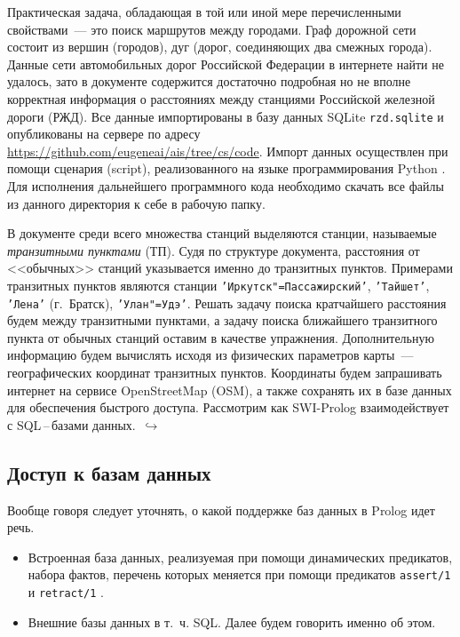 \documentclass[a4paper,14pt, openany, twoside, draft]{extbook} %
\newcommand{\nnn}[2][ncolor]{\noindent%
\textcolor{eclr}{!\ [}\textcolor{#1}{#2}\textcolor{eclr}{]}}
\newcommand{\goforth}[1]{$\,\hookrightarrow$\pageref{#1}}
\begin{document}

Практическая задача, обладающая в той или иной мере перечисленными свойствами~--- это поиск маршрутов между городами.  Граф дорожной сети состоит из вершин (городов), дуг (дорог, соединяющих два смежных города).  Данные сети автомобильных дорог Российской Федерации в интернете найти не удалось, зато в документе \cite{rzhddb} содержится достаточно подробная но не вполне корректная информация о расстояниях между станциями Российской железной дороги (РЖД).  Все данные импортированы в базу данных SQLite \cite{sqlite} \texttt{rzd.sqlite} и опубликованы на сервере по адресу \url{https://github.com/eugeneai/ais/tree/cs/code}.  Импорт данных осуществлен при помощи сценария (script), реализованного на языке программирования Python \cite{pythondoc,pythondl,pythonbook}.  Для исполнения дальнейшего программного кода необходимо скачать все файлы из данного директория к себе в рабочую папку.

В документе \cite{rzhddb} среди всего множества станций выделяются станции, называемые \emph{транзитными пунктами} (ТП).  Судя по структуре документа, расстояния от <<обычных>> станций указывается именно до транзитных пунктов.  Примерами транзитных пунктов являются станции \texttt{'Иркутск"=Пассажирский'}, \texttt{'Тайшет'}, \texttt{'Лена'} (г.~Братск), \texttt{'Улан"=Удэ'}.  Решать задачу поиска кратчайшего расстояния будем между транзитными пунктами, а задачу поиска ближайшего транзитного пункта от обычных станций оставим в качестве упражнения.  Дополнительную информацию будем вычислять исходя из физических параметров карты~--- географических координат транзитных пунктов.  Координаты будем запрашивать интернет на сервисе \foreignlanguage{english}{Open\-Street\-Map} (OSM), а также сохранять их в базе данных для обеспечения быстрого доступа.  Рассмотрим как SWI-Prolog взаимодействует с SQL\,--\,базами данных. \goforth{par:informedcont}

\subsection{Доступ к базам данных}
\label{sec:dbms}

Вообще говоря следует уточнять, о какой поддержке баз данных в Prolog идет речь.
\begin{itemize}
\item Встроенная база данных, реализуемая при помощи динамических предикатов, набора фактов, перечень которых меняется при помощи предикатов \texttt{assert/1} и \texttt{retract/1} \cite{ais,Bratko}.
\item Внешние базы данных в т.~ч. SQL.  Далее будем говорить именно об этом.
\end{itemize}
\end{document}
